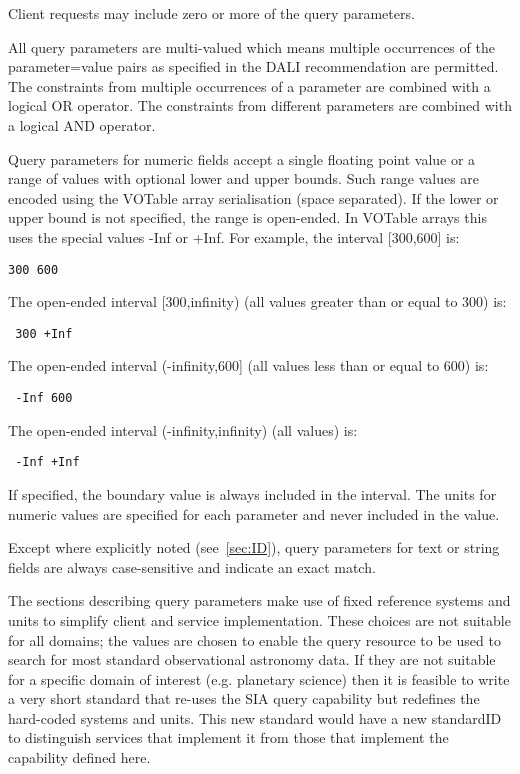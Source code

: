 \documentclass[11pt,a4paper]{ivoa}
\begin{document}
Client requests may include zero or more of the query parameters.

All query parameters are multi-valued which means multiple occurrences of the parameter=value pairs as specified in the DALI recommendation are permitted. The constraints from multiple occurrences of a parameter are combined with a logical OR operator. The constraints from different parameters are combined with a logical AND operator.

Query parameters for numeric fields accept a single floating point value or a range of values with optional lower and upper bounds. Such range values are encoded using the VOTable array serialisation (space separated). If  the lower or upper bound is not specified, the range is open-ended. In VOTable arrays this uses the special values -Inf or +Inf. For example, the interval [300,600] is:

\begin{lstlisting}
300 600
\end{lstlisting}
The open-ended interval [300,infinity) (all values greater than or equal to 300) is:

\begin{lstlisting}
 300 +Inf
\end{lstlisting}
The open-ended interval (-infinity,600] (all values less than or equal to 600) is:

\begin{lstlisting}
 -Inf 600
\end{lstlisting}
 The open-ended interval (-infinity,infinity) (all values) is:

\begin{lstlisting}
 -Inf +Inf
\end{lstlisting}
If specified, the boundary value is always included in the interval.
The units for numeric values are specified for each parameter and never included in the value.

Except where explicitly noted (see~\ref{sec:ID}), query parameters for text or string fields are always case-sensitive and indicate an exact match.

The sections describing query parameters make use of fixed reference systems and units to simplify client and service implementation. These choices are not suitable for all domains; the values are chosen to enable the {query} resource to be used to search for most standard observational astronomy data. If they are not suitable for a specific domain of interest (e.g. planetary science) then it is feasible to write a very short standard that re-uses the SIA {query} capability but redefines the hard-coded systems and units. This new standard would have a new standardID to distinguish services that implement it from those that implement the capability defined here.
\end{document}
